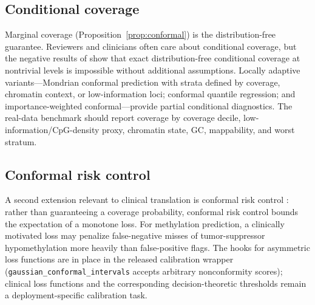 \subsection{Conditional coverage}
Marginal coverage (Proposition~\ref{prop:conformal}) is the distribution-free guarantee. Reviewers and clinicians often care about conditional coverage, but the negative results of \citet{foygelbarber2021limits} show that exact distribution-free conditional coverage at nontrivial levels is impossible without additional assumptions. Locally adaptive variants---Mondrian conformal prediction with strata defined by coverage, chromatin context, or low-information loci; conformal quantile regression; and importance-weighted conformal---provide partial conditional diagnostics. The real-data benchmark should report coverage by coverage decile, low-information/CpG-density proxy, chromatin state, GC, mappability, and worst stratum.

\subsection{Conformal risk control}
A second extension relevant to clinical translation is conformal risk control \citep{angelopoulos2024crc}: rather than guaranteeing a coverage probability, conformal risk control bounds the expectation of a monotone loss. For methylation prediction, a clinically motivated loss may penalize false-negative misses of tumor-suppressor hypomethylation more heavily than false-positive flags. The hooks for asymmetric loss functions are in place in the released calibration wrapper (\texttt{gaussian\_conformal\_intervals} accepts arbitrary nonconformity scores); clinical loss functions and the corresponding decision-theoretic thresholds remain a deployment-specific calibration task.

